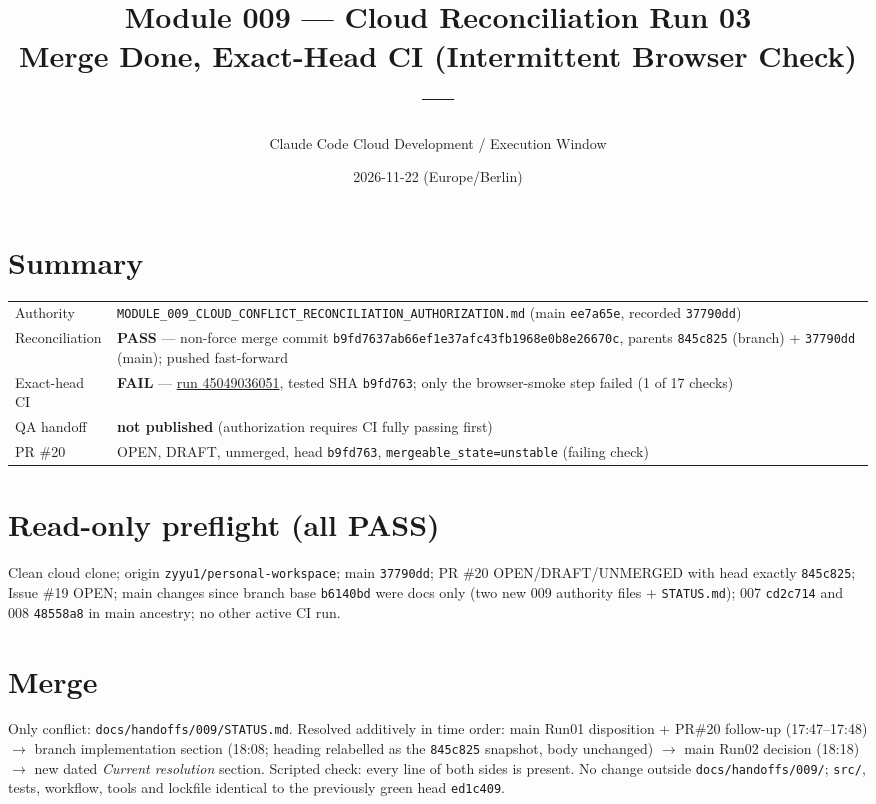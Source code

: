 \documentclass[11pt,a4paper]{article}
\title{Module 009 --- Cloud Reconciliation Run 03\\Merge Done, Exact-Head CI \FAIL{} (Intermittent Browser Check) --- \STOP}
\author{Claude Code Cloud Development / Execution Window}
\date{2026-11-22 (Europe/Berlin)}
\newcommand{\sha}[1]{\texttt{\small #1}}
\newcommand{\PASS}{\textcolor{green!50!black}{\textbf{PASS}}}
\newcommand{\FAIL}{\textcolor{red!70!black}{\textbf{FAIL}}}
\begin{document}
\maketitle
\section*{Summary}
\begin{tabularx}{\textwidth}{@{}lX@{}}
\toprule
Authority & \texttt{MODULE\_009\_CLOUD\_CONFLICT\_RECONCILIATION\_AUTHORIZATION.md} (main \sha{ee7a65e}, recorded \sha{37790dd}) \\
Reconciliation & \PASS{} --- non-force merge commit \sha{b9fd7637ab66ef1e37afc43fb1968e0b8e26670c}, parents \sha{845c825} (branch) + \sha{37790dd} (main); pushed fast-forward \\
Exact-head CI & \FAIL{} --- \href{https://github.com/zyyu1/personal-workspace/actions/runs/45049036051}{run 45049036051}, tested SHA \sha{b9fd763}; only the browser-smoke step failed (1 of 17 checks) \\
QA handoff & \textbf{not published} (authorization requires CI fully passing first) \\
PR \#20 & OPEN, DRAFT, unmerged, head \sha{b9fd763}, \texttt{mergeable\_state=unstable} (failing check) \\
\bottomrule
\end{tabularx}

\section{Read-only preflight (all \PASS)}
Clean cloud clone; origin \texttt{zyyu1/personal-workspace}; main \sha{37790dd}; PR \#20 OPEN/DRAFT/UNMERGED with head exactly \sha{845c825}; Issue \#19 OPEN; main changes since branch base \sha{b6140bd} were docs only (two new 009 authority files + \texttt{STATUS.md}); 007 \sha{cd2c714} and 008 \sha{48558a8} in main ancestry; no other active CI run.

\section{Merge}
Only conflict: \texttt{docs/handoffs/009/STATUS.md}. Resolved additively in time order: main Run01 disposition + PR\#20 follow-up (17:47--17:48) $\to$ branch implementation section (18:08; heading relabelled as the \sha{845c825} snapshot, body unchanged) $\to$ main Run02 decision (18:18) $\to$ new dated \emph{Current resolution} section. Scripted check: every line of both sides is present. No change outside \texttt{docs/handoffs/009/}; \texttt{src/}, tests, workflow, tools and lockfile identical to the previously green head \sha{ed1c409}.
\end{document}
